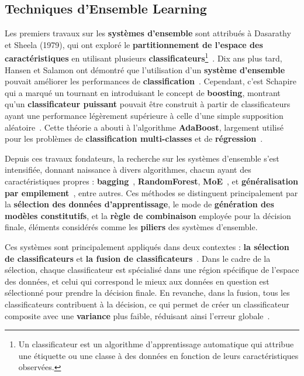 \subsection{Techniques d'Ensemble Learning}

Les premiers travaux sur les \textbf{systèmes d'ensemble} sont attribués à Dasarathy et Sheela (1979), qui ont exploré le \textbf{partitionnement de l'espace des caractéristiques} en utilisant plusieurs \textbf{classificateurs}\footnote{Un classificateur est un algorithme d'apprentissage automatique qui attribue une étiquette ou une classe à des données en fonction de leurs caractéristiques observées.}~\cite{dasarathy1979}. Dix ans plus tard, Hansen et Salamon ont démontré que l'utilisation d'un \textbf{système d'ensemble} pouvait améliorer les performances de \textbf{classification}~\cite{hansen1990}. Cependant, c'est Schapire qui a marqué un tournant en introduisant le concept de \textbf{boosting}, montrant qu'un \textbf{classificateur puissant} pouvait être construit à partir de classificateurs ayant une performance légèrement supérieure à celle d'une simple supposition aléatoire~\cite{schapire1990}. Cette théorie a abouti à l'algorithme \textbf{AdaBoost}, largement utilisé pour les problèmes de \textbf{classification multi-classes} et de \textbf{régression}~\cite{freund1997}.

Depuis ces travaux fondateurs, la recherche sur les systèmes d'ensemble s'est intensifiée, donnant naissance à divers algorithmes, chacun ayant des caractéristiques propres : \textbf{bagging}~\cite{breiman1996}, \textbf{RandomForest}, \textbf{MoE}~\cite{jacobs1991}, et \textbf{généralisation par empilement}~\cite{wolpert1992}, entre autres. Ces méthodes se distinguent principalement par la \textbf{sélection des données d'apprentissage}, le mode de \textbf{génération des modèles constitutifs}, et la \textbf{règle de combinaison} employée pour la décision finale, éléments considérés comme les \textbf{piliers} des systèmes d'ensemble.

Ces systèmes sont principalement appliqués dans deux contextes : \textbf{la sélection de classificateurs} et \textbf{la fusion de classificateurs}~\cite{kuncheva2004}. Dans le cadre de la sélection, chaque classificateur est spécialisé dans une région spécifique de l'espace des données, et celui qui correspond le mieux aux données en question est sélectionné pour prendre la décision finale. En revanche, dans la fusion, tous les classificateurs contribuent à la décision, ce qui permet de créer un classificateur composite avec une \textbf{variance} plus faible, réduisant ainsi l'erreur globale~\cite{breiman1996, freund1997}.

